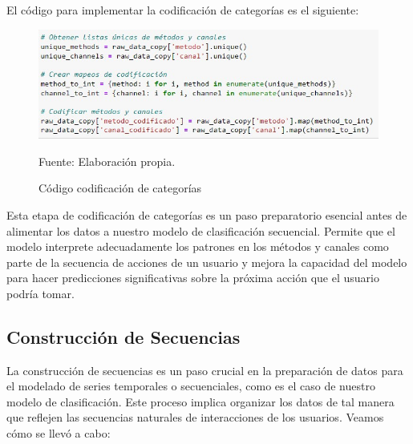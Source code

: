 El código para implementar la codificación de categorías es el siguiente:

\begin{figure}[H]
    \begin{minipage}[t]{0.9\textwidth}
        \caption{Código codificación de categorías}
        \label{codificación_categorias}        
    \end{minipage}

    \vspace{10pt}

    \begin{minipage}[b]{1\textwidth}
        \centering
        \includegraphics[width=\textwidth]{img/Código codificación categorias.jpg}        
    \end{minipage}

    \begin{minipage}[t]{0.9\textwidth}
        Fuente: Elaboración propia.
    \end{minipage}
\end{figure}

Esta etapa de codificación de categorías es un paso preparatorio esencial antes de alimentar los datos a nuestro modelo de clasificación secuencial. Permite que el modelo interprete adecuadamente los patrones en los métodos y canales como parte de la secuencia de acciones de un usuario y mejora la capacidad del modelo para hacer predicciones significativas sobre la próxima acción que el usuario podría tomar.

\subsection{Construcción de Secuencias}

La construcción de secuencias es un paso crucial en la preparación de datos para el modelado de series temporales o secuenciales, como es el caso de nuestro modelo de clasificación. Este proceso implica organizar los datos de tal manera que reflejen las secuencias naturales de interacciones de los usuarios. Veamos cómo se llevó a cabo:

